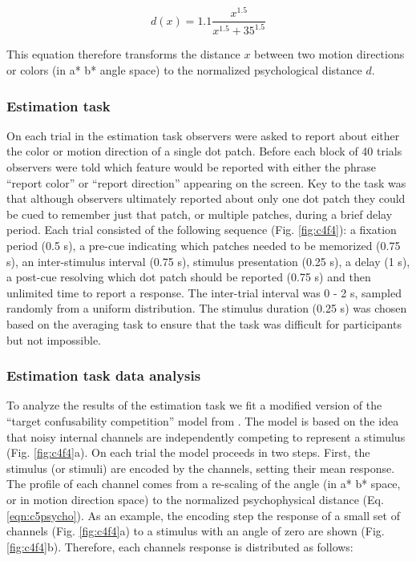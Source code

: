 \begin{equation}
    d(x) = 1.1\frac{x^{1.5}}{x^{1.5}+35^{1.5}}
    \label{eqn:c5psycho}
\end{equation}

This equation therefore transforms the distance $x$ between two motion directions or colors (in a* b* angle space) to the normalized psychological distance $d$. 

\subsubsection{Estimation task}

On each trial in the estimation task observers were asked to report about either the color or motion direction of a single dot patch. Before each block of 40 trials observers were told which feature would be reported with either the phrase ``report color'' or ``report direction'' appearing on the screen. Key to the task was that although observers ultimately reported about only one dot patch they could be cued to remember just that patch, or multiple patches, during a brief delay period. Each trial consisted of the following sequence (Fig. \ref{fig:c4f4}): a fixation period (0.5 s), a pre-cue indicating which patches needed to be memorized (0.75 s), an inter-stimulus interval (0.75 s), stimulus presentation (0.25 s), a delay (1 s), a post-cue resolving which dot patch should be reported (0.75 s) and then unlimited time to report a response. The inter-trial interval was 0 - 2 s, sampled randomly from a uniform distribution. The stimulus duration (0.25 s) was chosen based on the averaging task to ensure that the task was difficult for participants but not impossible. 

\subsubsection{Estimation task data analysis}

To analyze the results of the estimation task we fit a modified version of the ``target confusability competition'' model from \citet{Schurgin2018-vi}. The model is based on the idea that noisy internal channels are independently competing to represent a stimulus (Fig. \ref{fig:c4f4}a). On each trial the model proceeds in two steps. First, the stimulus (or stimuli) are encoded by the channels, setting their mean response. The profile of each channel comes from a re-scaling of the angle (in a* b* space, or in motion direction space) to the normalized psychophysical distance (Eq. \ref{eqn:c5psycho}). As an example, the encoding step the response of a small set of channels (Fig. \ref{fig:c4f4}a) to a stimulus with an angle of zero are shown (Fig. \ref{fig:c4f4}b). Therefore, each channels response is distributed as follows:

